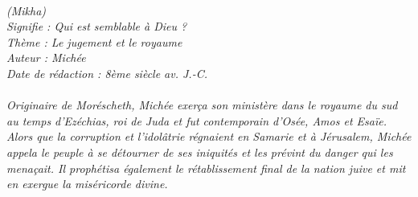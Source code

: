 \BFont
\noindent\hrulefill
{\footnotesize
\textit{
\bigskip
{\centering{}
\\(Mikha)
\\Signifie : Qui est semblable à Dieu ?
\\Thème : Le jugement et le royaume
\\Auteur : Michée 
\\Date de rédaction : 8ème siècle av. J.-C.\\}
}
\textit{
\\Originaire de Moréscheth, Michée exerça son ministère dans le royaume du sud au temps d’Ezéchias, roi de Juda et fut contemporain d’Osée, Amos et Esaïe. Alors que la corruption et l’idolâtrie régnaient en Samarie et à Jérusalem, Michée appela le peuple à se détourner de ses iniquités et les prévint du danger qui les menaçait. Il prophétisa également le rétablissement final de la nation juive et mit en exergue la miséricorde divine.\bigskip
}
}
\par\nobreak\noindent\hrulefill
